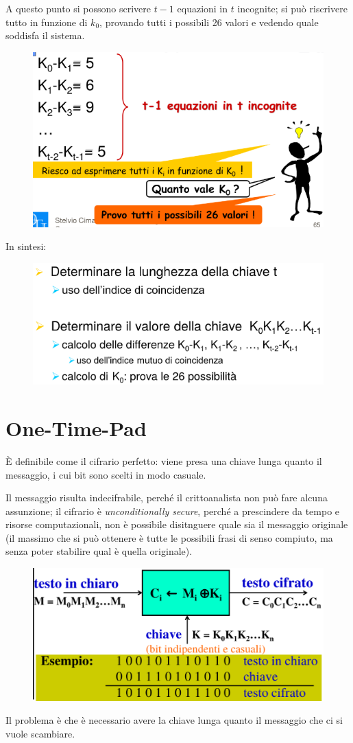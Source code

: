 \noindent A questo punto si possono scrivere $t-1$ equazioni in $t$ incognite; si può riscrivere tutto in 
funzione di $k_0$, provando tutti i possibili 26 valori e vedendo quale soddisfa il sistema.

\begin{figure}[H]
    \centering
    \includegraphics[width=0.6\linewidth]{chapters/chap02/images/imc6.png}
\end{figure} 

\noindent In sintesi:

\begin{figure}[H]
    \includegraphics[width=0.7\linewidth]{chapters/chap02/images/vigenere3.png}
\end{figure}

\newpage
\section{One-Time-Pad}

È definibile come il cifrario perfetto: viene presa una chiave lunga 
quanto il messaggio, i cui bit sono scelti in modo casuale.

\noindent Il messaggio risulta indecifrabile, perché il crittoanalista non può fare 
alcuna assunzione; il cifrario è \textit{unconditionally secure}, perché a prescindere 
da tempo e risorse computazionali, non è possibile disitnguere quale sia il messaggio 
originale (il massimo che si può ottenere è tutte le possibili frasi di senso compiuto, ma 
senza poter stabilire qual è quella originale).

\begin{figure}[H]
    \centering
    \includegraphics[width=0.7\linewidth]{chapters/chap02/images/otp.png}
\end{figure}

\noindent Il problema è che è necessario avere la chiave lunga quanto il messaggio che ci 
si vuole scambiare.


